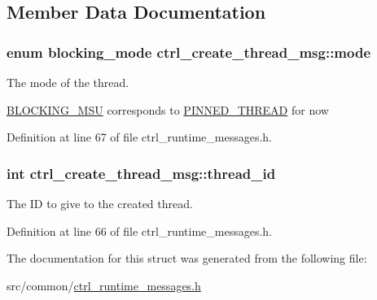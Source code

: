 \subsection{Member Data Documentation}
\hypertarget{structctrl__create__thread__msg_af74075761b9c8f46b619d33d4ef21c81}{
\subsubsection[{mode}]{\setlength{\rightskip}{0pt plus 5cm}enum {\bf blocking\-\_\-mode} ctrl\-\_\-create\-\_\-thread\-\_\-msg\-::mode}}\label{structctrl__create__thread__msg_af74075761b9c8f46b619d33d4ef21c81}


The mode of the thread. 

\hyperlink{dfg_8h_af31ca3002c5b769551da6f1183bafed5a3e9aecc35fdf55d99ab9e876cce4411c}{B\-L\-O\-C\-K\-I\-N\-G\-\_\-\-M\-S\-U} corresponds to \hyperlink{dfg_8h_a673ccd9aadafd31e8beaf16423c07db2ad7379b426f921781afd49485009640f0}{P\-I\-N\-N\-E\-D\-\_\-\-T\-H\-R\-E\-A\-D} for now 

Definition at line 67 of file ctrl\-\_\-runtime\-\_\-messages.\-h.

\hypertarget{structctrl__create__thread__msg_a930a1b6ad3d62f876fa6ce4a44f2daf1}{
\subsubsection[{thread\-\_\-id}]{\setlength{\rightskip}{0pt plus 5cm}int ctrl\-\_\-create\-\_\-thread\-\_\-msg\-::thread\-\_\-id}}\label{structctrl__create__thread__msg_a930a1b6ad3d62f876fa6ce4a44f2daf1}


The I\-D to give to the created thread. 



Definition at line 66 of file ctrl\-\_\-runtime\-\_\-messages.\-h.



The documentation for this struct was generated from the following file\-:\begin{DoxyCompactItemize}
\item 
src/common/\hyperlink{ctrl__runtime__messages_8h}{ctrl\-\_\-runtime\-\_\-messages.\-h}\end{DoxyCompactItemize}
